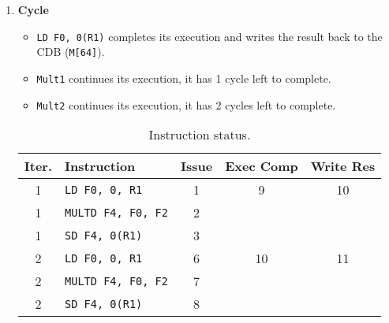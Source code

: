 \begin{enumerate}
    \newpage


    \item \textbf{Cycle \theenumi}
    \begin{itemize}
        \item \texttt{LD F0, 0(R1)} completes its execution and writes the result back to the CDB (\texttt{M[64]}).
        

        \item \texttt{Mult1} continues its execution, it has 1 cycle left to complete.


        \item \texttt{Mult2} continues its execution, it has 2 cycles left to complete.
    \end{itemize}
    \begin{table}[!htp]
        \centering
        \begin{tabular}{@{} c l | c c c @{}}
            \toprule
            Iter.       & Instruction                   & Issue & Exec Comp & Write Res \\
            \midrule
            1           & \texttt{LD    F0, 0, R1}      & 1     & 9         & 10        \\ [.3em]
            1           & \texttt{MULTD F4, F0, F2}     & 2     &           &           \\ [.3em]
            1           & \texttt{SD    F4, 0(R1)}      & 3     &           &           \\ [.3em]
            2           & \texttt{LD    F0, 0, R1}      & 6     & 10        & 11        \\ [.3em]
            2           & \texttt{MULTD F4, F0, F2}     & 7     &           &           \\ [.3em]
            2           & \texttt{SD    F4, 0(R1)}      & 8     &           &           \\
            \bottomrule
        \end{tabular}
        \caption*{Instruction status.}
    \end{table}


\end{enumerate}
